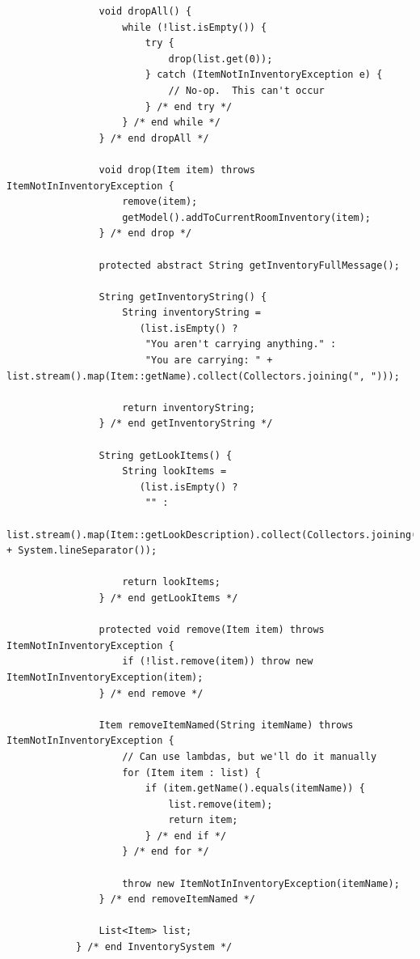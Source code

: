 \documentclass[a4paper, 11pt]{article}
\begin{document}
\begin{lstlisting}
                void dropAll() {
                    while (!list.isEmpty()) {
                        try {
                            drop(list.get(0));
                        } catch (ItemNotInInventoryException e) {
                            // No-op.  This can't occur
                        } /* end try */
                    } /* end while */
                } /* end dropAll */

                void drop(Item item) throws ItemNotInInventoryException {
                    remove(item);
                    getModel().addToCurrentRoomInventory(item);
                } /* end drop */

                protected abstract String getInventoryFullMessage();

                String getInventoryString() {
                    String inventoryString =
                       (list.isEmpty() ?
                        "You aren't carrying anything." :
                        "You are carrying: " + list.stream().map(Item::getName).collect(Collectors.joining(", ")));

                    return inventoryString;
                } /* end getInventoryString */

                String getLookItems() {
                    String lookItems =
                       (list.isEmpty() ?
                        "" :
                        list.stream().map(Item::getLookDescription).collect(Collectors.joining(System.lineSeparator())) + System.lineSeparator());

                    return lookItems;
                } /* end getLookItems */

                protected void remove(Item item) throws ItemNotInInventoryException {
                    if (!list.remove(item)) throw new ItemNotInInventoryException(item);
                } /* end remove */

                Item removeItemNamed(String itemName) throws ItemNotInInventoryException {
                    // Can use lambdas, but we'll do it manually
                    for (Item item : list) {
                        if (item.getName().equals(itemName)) {
                            list.remove(item);
                            return item;
                        } /* end if */
                    } /* end for */

                    throw new ItemNotInInventoryException(itemName);
                } /* end removeItemNamed */

                List<Item> list;
            } /* end InventorySystem */


\end{lstlisting}
\end{document}
